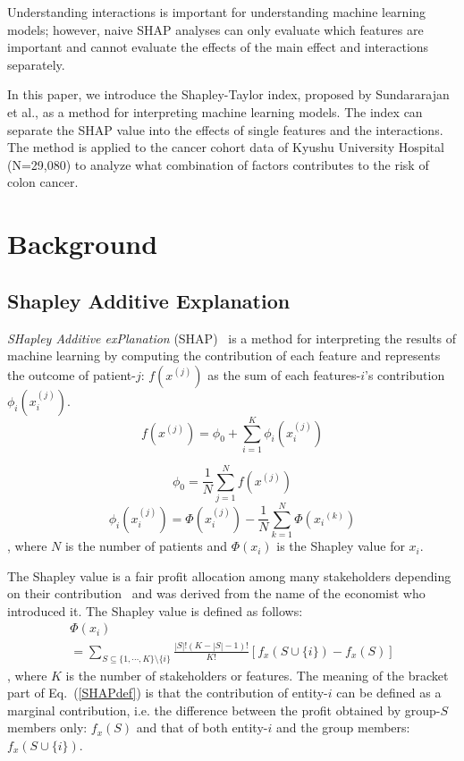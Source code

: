 \documentclass[nohyperref]{article}
\theoremstyle{plain}
\theoremstyle{definition}
\theoremstyle{remark}
\begin{document}
Understanding interactions is important for understanding machine learning models; however, naive SHAP analyses can only evaluate which features are important and cannot evaluate the effects of the main effect and interactions separately.

In this paper, we introduce the Shapley-Taylor index, proposed by Sundararajan et al., as a method for interpreting machine learning models. The index can separate the SHAP value into the effects of single features and the interactions.
The method is applied to the cancer cohort data of Kyushu University Hospital (N=29,080) to analyze what combination of factors contributes to the risk of colon cancer.



\section{Background}

\subsection{Shapley Additive Explanation}

\textit{SHapley Additive exPlanation} (SHAP)~\cite{lundberg2017unified} is a method for interpreting the results of machine learning by computing the contribution of each feature and represents the outcome of patient-$j$: $f(x^{(j)})$ as the sum of each features-$i$'s contribution $\phi_i(x_i^{(j)})$.
\begin{equation}
f(x^{(j)})=\phi_0+\sum_{i=1}^{K} \phi_i(x_i^{(j)})
\end{equation}

\begin{equation}
\phi_0=\frac{1}{N} \sum_{j=1}^{N} f(x^{(j)})
\end{equation}
\begin{equation}
\phi_i(x_i^{(j)})=\Phi(x_i^{(j)}) - \frac{1}{N} \sum_{k=1}^{N} \Phi({x_i}^{(k)})
\label{phi}
\end{equation}
, where $N$ is the number of patients and $\Phi(x_i)$ is the Shapley value for $x_i$.

 
The Shapley value is a fair profit allocation among many stakeholders depending on their contribution~\cite{roth1988shapley} and was derived from the name of the economist who introduced it. The Shapley value is defined as follows:
\begin{multline}
\Phi(x_i) \\ =\sum_{S \subseteq \{1,\cdots,K\} \setminus \{i\}} \frac{|S|!(K-|S|-1)!}{K!}[f_{x}(S\cup\{i\})-f_{x}(S)]
\label{SHAPdef}
\end{multline}
, where $K$ is the number of stakeholders or features.
The meaning of the bracket part of Eq.~(\ref{SHAPdef}) is that the contribution of entity-$i$ can be defined as a marginal contribution, i.e. the difference between the profit obtained by group-$S$ members only: $f_{x}(S)$ and that of both entity-$i$ and the group members: $f_{x}(S\cup\{i\})$.
\end{document}
